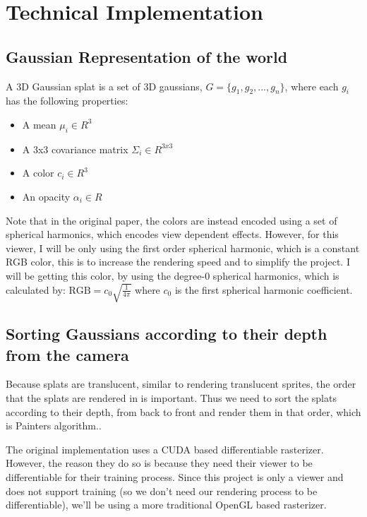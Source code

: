 \documentclass {article}
\begin{document}
\section{Technical Implementation}
\subsection{Gaussian Representation of the world}

     A 3D Gaussian splat is a set of 3D gaussians, $G = \{g_1, g_2, ..., g_n\}$, where each $g_i$ has the following properties:
     \begin{itemize}
     \item A mean $\mu_i \in R^3$
     \item A 3x3 covariance matrix $\Sigma_i \in R^{3x3}$
     \item A color $c_i \in R^3$
     \item An opacity $\alpha_i \in R$
     \end{itemize}

     Note that in the original paper, the colors are instead encoded using a set of spherical harmonics, which encodes view dependent effects. However, for this viewer, I will be only using the first order spherical harmonic, which is a constant RGB color, this is to increase the rendering speed and to simplify the project. I will be getting this color, by using the degree-0 spherical harmonics, which is calculated by:
     $\text{RGB} = c_0 \sqrt{\frac{1}{4\pi}}$
     where $c_0$ is the first spherical harmonic coefficient.
     \\

     
     \subsection{Sorting Gaussians according to their depth from the camera}
     Because splats are translucent, similar to rendering translucent sprites, the order that the splats are rendered in is important. Thus we need to sort the splats according to their depth, from back to front and render them in that order, which is Painters algorithm..

     The original implementation uses a CUDA based differentiable rasterizer. However, the reason they do so is because they need their viewer to be differentiable for their training process. Since this project is only a viewer and does not support training (so we don't need our rendering process to be differentiable), we'll be using a more traditional OpenGL based rasterizer.
\end{document}
